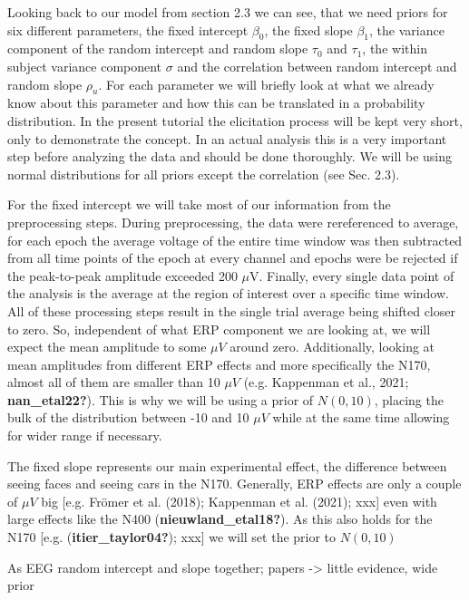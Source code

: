 \documentclass[
  doc,12pt,floatsintext]{apa7}
\begin{document}
Looking back to our model from section 2.3 we can see, that we need priors for six different parameters, the fixed intercept \(\beta_0\), the fixed slope \(\beta_1\), the variance component of the random intercept and random slope \(\tau_0\) and \(\tau_1\), the within subject variance component \(\sigma\) and the correlation between random intercept and random slope \(\rho_u\). For each parameter we will briefly look at what we already know about this parameter and how this can be translated in a probability distribution. In the present tutorial the elicitation process will be kept very short, only to demonstrate the concept. In an actual analysis this is a very important step before analyzing the data and should be done thoroughly. We will be using normal distributions for all priors except the correlation (see Sec. 2.3).

For the fixed intercept we will take most of our information from the preprocessing steps. During preprocessing, the data were rereferenced to average, for each epoch the average voltage of the entire time window was then subtracted from all time points of the epoch at every channel and epochs were be rejected if the peak-to-peak amplitude exceeded 200 \(\mu\)V. Finally, every single data point of the analysis is the average at the region of interest over a specific time window. All of these processing steps result in the single trial average being shifted closer to zero. So, independent of what ERP component we are looking at, we will expect the mean amplitude to some \(\mu V\) around zero. Additionally, looking at mean amplitudes from different ERP effects and more specifically the N170, almost all of them are smaller than 10 \(\mu V\) (e.g. Kappenman et al., 2021; \textbf{nan\_etal22?}). This is why we will be using a prior of \(N(0, 10)\), placing the bulk of the distribution between -10 and 10 \(\mu V\) while at the same time allowing for wider range if necessary.

The fixed slope represents our main experimental effect, the difference between seeing faces and seeing cars in the N170. Generally, ERP effects are only a couple of \(\mu V\) big {[}e.g. Frömer et al. (2018); Kappenman et al. (2021); xxx{]} even with large effects like the N400 (\textbf{nieuwland\_etal18?}). As this also holds for the N170 {[}e.g. (\textbf{itier\_taylor04?}); xxx{]} we will set the prior to \(N(0, 10)\)

As EEG random intercept and slope
together; papers -\textgreater{} little evidence, wide prior
\end{document}

